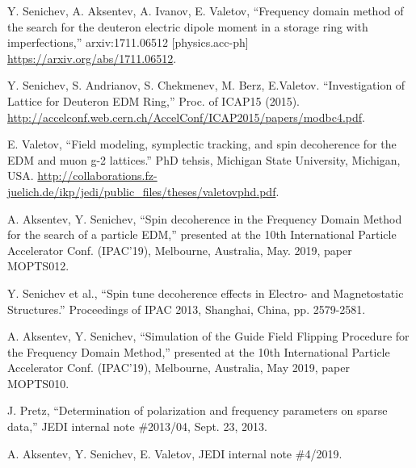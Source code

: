 \documentclass[]{elsarticle}
\begin{document}
\begin{thebibliography}{9}
  Y. Senichev, A. Aksentev, A. Ivanov, E. Valetov, ``Frequency domain method of the search for
  the deuteron electric dipole moment in a storage ring with imperfections,'' arxiv:1711.06512 [physics.acc-ph]
  \url{https://arxiv.org/abs/1711.06512}.

  Y. Senichev, S. Andrianov, S. Chekmenev, M. Berz, E.Valetov. ``Investigation of Lattice for Deuteron EDM Ring,''
  Proc. of ICAP15 (2015). \url{http://accelconf.web.cern.ch/AccelConf/ICAP2015/papers/modbc4.pdf}.

  E. Valetov, ``Field modeling, symplectic tracking, and spin decoherence for the EDM and muon g-2 lattices.''
  PhD tehsis, Michigan State University, Michigan, USA.
  \url{http://collaborations.fz-juelich.de/ikp/jedi/public_files/theses/valetovphd.pdf}.

  A. Aksentev, Y. Senichev, ``Spin decoherence in the Frequency Domain Method for the search of a particle EDM,''
  presented at the 10th International Particle Accelerator Conf. (IPAC'19), Melbourne, Australia,
  May. 2019, paper MOPTS012.

  Y. Senichev et al., ``Spin tune decoherence effects in Electro- and Magnetostatic Structures.''
  Proceedings of IPAC 2013, Shanghai, China, pp. 2579-2581.

  A. Aksentev, Y. Senichev, ``Simulation of the Guide Field Flipping Procedure for the Frequency Domain Method,'' 
  presented at the 10th International Particle Accelerator Conf. (IPAC'19), Melbourne, Australia,
  May 2019, paper MOPTS010.

  J. Pretz, ``Determination of polarization and frequency parameters on sparse data,'' JEDI internal
  note \#2013/04, Sept. 23, 2013.
  
  A. Aksentev, Y. Senichev, E. Valetov, JEDI internal note \#4/2019.
  
\end{thebibliography}
\end{document}

